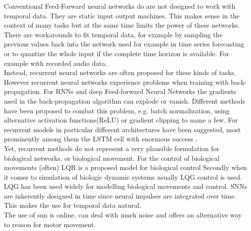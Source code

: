 Conventional Feed-Forward neural networks do are not designed to work with temporal data. They are static input output machines. This makes sense in the context of many tasks but at the same time limits the power of these networks. There are workarounds to fit temporal data, for example by sampling the previous values back into the network used for example in time series forecasting \cite{tang_feedforward_1993}\cite{yang_cascade_2022}\cite{uncini_audio_2003} or to quantize the whole input if the complete time horizon is available. For example with recorded audio data.\\
Instead, recurrent neural networks are often proposed for these kinds of tasks. However recurrent neural networks experience problems when training with back-propagation\cite{bengio_learning_1994}. For \acp{RNN} and deep Feed-forward Neural Networks the gradients used in the back-propagation algorithm can explode or vanish. Different methods have been proposed to combat this problem, e.g. batch normalization\cite{ioffe_batch_2015}, using alternative activation functions(ReLU)\cite{nair_rectified_2010} or gradient clipping\cite{pascanu_difficulty_2013} to name a few. For recurrent models in particular different architectures have been suggested, most prominently among them the LSTM cell \cite{hochreiter_long_1997} with enormous success \cite{mayer_system_2006, sak_long_2014, li_constructing_2015}.\\
Yet, recurrent methods do not represent a very plausible formulation for biological networks. or biological movement.
For the control of biological movements (often) \ac{LQR} is a proposed model for biological control \cite{li_iterative_2004}
Secondly when it comes to simulation of biologic dynamic systems usually \ac{LQG} control is used. LQG has been used widely for modelling biological movements and control.
\acp{SNN} are inherently designed in time since neural impulses are integrated over time. This makes the use for temporal data natural.\\
The use of snn is online, can deal with much noise and offers an alternative way to reason for motor movement.

